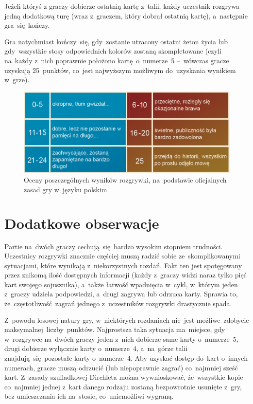 \documentclass[declaration,shortabstract,inz]{iithesis}
\begin{document}
Jeżeli któryś z graczy dobierze ostatnią kartę z~talii, każdy uczestnik rozgrywa jedną dodatkową turę (wraz z~graczem, który dobrał ostatnią kartę), a~następnie gra~się kończy.

Gra natychmiast kończy~się, gdy~zostanie utracony ostatni żeton życia lub gdy~wszystkie stosy odpowiednich kolorów zostaną skompletowane (czyli na~każdy z~nich poprawnie położono kartę o~numerze~5 --~wówczas gracze uzyskują 25~punktów, co~jest najwyższym możliwym do~uzyskania wynikiem w~grze).

\bigskip

\begin{figure}[H]
	\centering
	\captionsetup{format=hang}
	\includegraphics[width=\textwidth,height=\textheight,keepaspectratio]{scores.png}
	\caption[Caption]{Oceny poszczególnych wyników rozgrywki, na~podstawie oficjalnych zasad gry w~języku polskim\footnotemark}
	\label{fig:scores}
\end{figure}


\section{Dodatkowe obserwacje}

Partie na~dwóch graczy cechują~się bardzo wysokim stopniem trudności. Uczestnicy rozgrywki znacznie częściej muszą radzić sobie ze~skomplikowanymi sytuacjami, które wynikają z~niekorzystnych rozdań. Fakt ten jest spotęgowany przez znikomą ilość dostępnych informacji (każdy z~graczy widzi naraz tylko pięć kart swojego sojusznika), a~także łatwość wpadnięcia w~cykl, w~którym jeden z~graczy udziela podpowiedzi, a~drugi zagrywa lub odrzuca karty. Sprawia to, że~częstotliwość zagrań jednego z~uczestników rozgrywki drastycznie spada.

Z~powodu losowej natury gry, w~niektórych rozdaniach nie~jest możliwe zdobycie maksymalnej liczby punktów. Najprostsza taka sytuacja ma~miejsce, gdy w~rozgrywce na~dwóch graczy jeden z~nich dobierze same karty o~numerze~5, drugi dobierze wyłącznie karty o~numerze~4, a~na~górze talii znajdują~się pozostałe karty o~numerze~4. Aby uzyskać dostęp do~kart o~innych numerach, gracze muszą odrzucić (lub niepoprawnie zagrać) co~najmniej sześć kart. Z~zasady szufladkowej Dirchleta można wywnioskować, że~wszystkie kopie co~najmniej jednej z~kart danego rodzaju zostaną bezpowrotnie usunięte z~gry, bez umieszczania ich na~stosie, co~uniemożliwi wygraną.
\end{document}
